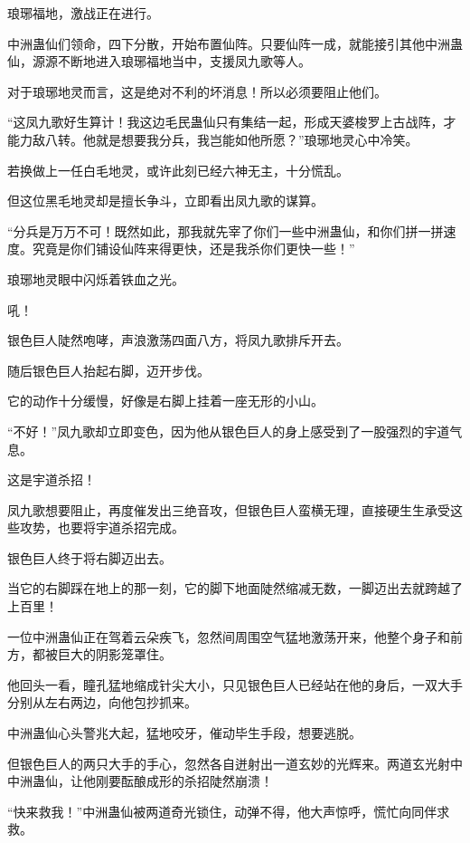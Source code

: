 
\begin{this_body}



琅琊福地，激战正在进行。

中洲蛊仙们领命，四下分散，开始布置仙阵。只要仙阵一成，就能接引其他中洲蛊仙，源源不断地进入琅琊福地当中，支援凤九歌等人。

对于琅琊地灵而言，这是绝对不利的坏消息！所以必须要阻止他们。

“这凤九歌好生算计！我这边毛民蛊仙只有集结一起，形成天婆梭罗上古战阵，才能力敌八转。他就是想要我分兵，我岂能如他所愿？”琅琊地灵心中冷笑。

若换做上一任白毛地灵，或许此刻已经六神无主，十分慌乱。

但这位黑毛地灵却是擅长争斗，立即看出凤九歌的谋算。

“分兵是万万不可！既然如此，那我就先宰了你们一些中洲蛊仙，和你们拼一拼速度。究竟是你们铺设仙阵来得更快，还是我杀你们更快一些！”

琅琊地灵眼中闪烁着铁血之光。

吼！

银色巨人陡然咆哮，声浪激荡四面八方，将凤九歌排斥开去。

随后银色巨人抬起右脚，迈开步伐。

它的动作十分缓慢，好像是右脚上挂着一座无形的小山。

“不好！”凤九歌却立即变色，因为他从银色巨人的身上感受到了一股强烈的宇道气息。

这是宇道杀招！

凤九歌想要阻止，再度催发出三绝音攻，但银色巨人蛮横无理，直接硬生生承受这些攻势，也要将宇道杀招完成。

银色巨人终于将右脚迈出去。

当它的右脚踩在地上的那一刻，它的脚下地面陡然缩减无数，一脚迈出去就跨越了上百里！

一位中洲蛊仙正在驾着云朵疾飞，忽然间周围空气猛地激荡开来，他整个身子和前方，都被巨大的阴影笼罩住。

他回头一看，瞳孔猛地缩成针尖大小，只见银色巨人已经站在他的身后，一双大手分别从左右两边，向他包抄抓来。

中洲蛊仙心头警兆大起，猛地咬牙，催动毕生手段，想要逃脱。

但银色巨人的两只大手的手心，忽然各自迸射出一道玄妙的光辉来。两道玄光射中中洲蛊仙，让他刚要酝酿成形的杀招陡然崩溃！

“快来救我！”中洲蛊仙被两道奇光锁住，动弹不得，他大声惊呼，慌忙向同伴求救。


\end{this_body}
